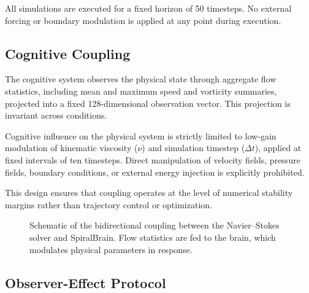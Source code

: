 \documentclass[12pt,a4paper]{article}
\begin{document}
All simulations are executed for a fixed horizon of 50 timesteps. No external forcing or boundary modulation is applied at any point during execution.

\subsection{Cognitive Coupling}

The cognitive system observes the physical state through aggregate flow statistics, including mean and maximum speed and vorticity summaries, projected into a fixed 128-dimensional observation vector. This projection is invariant across conditions.

Cognitive influence on the physical system is strictly limited to low-gain modulation of kinematic viscosity ($\nu$) and simulation timestep ($\Delta t$), applied at fixed intervals of ten timesteps. Direct manipulation of velocity fields, pressure fields, boundary conditions, or external energy injection is explicitly prohibited.

This design ensures that coupling operates at the level of numerical stability margins rather than trajectory control or optimization.

\begin{figure}[htbp!]
\centering
{}

\captionsetup{justification=raggedright, singlelinecheck=false} 
\caption{Schematic of the bidirectional coupling between the Navier--Stokes solver and SpiralBrain. Flow statistics are fed to the brain, which modulates physical parameters in response.} 
\label{fig:coupling_schematic} 
\end{figure}

\subsection{Observer-Effect Protocol}
\end{document}
